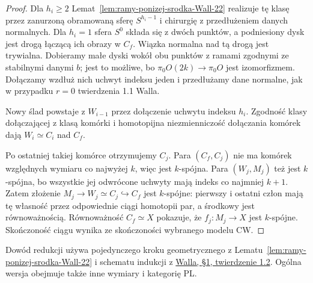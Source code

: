\begin{proof}
Dla $h_i\geq2$
Lemat~\ref{lem:ramy-ponizej-srodka-Wall-22}
realizuje tę klasę przez zanurzoną
obramowaną sferę $S^{h_i-1}$ i chirurgię
z przedłużeniem danych normalnych.
Dla $h_i=1$ sfera $S^0$ składa się
z dwóch punktów, a podniesiony dysk
jest drogą łączącą ich obrazy w $C_f$.
Wiązka normalna nad tą drogą jest
trywialna. Dobieramy małe dyski wokół
obu punktów z ramami zgodnymi ze stabilnymi
danymi $b$; jest to możliwe, bo
$\pi_0 O(2k)\to\pi_0 O$ jest izomorfizmem.
Dołączamy wzdłuż nich uchwyt indeksu jeden
i przedłużamy dane normalne, jak w przypadku
$r=0$ twierdzenia 1.1 Walla.

Nowy ślad powstaje z $W_{i-1}$ przez
dołączenie uchwytu indeksu $h_i$.
Zgodność klasy dołączającej z klasą
komórki i homotopijna niezmienniczość
dołączania komórek dają
$W_i\simeq C_i$ nad $C_f$.

Po ostatniej takiej komórce otrzymujemy
$C_j$. Para $(C_f,C_j)$ nie ma komórek
względnych wymiaru co najwyżej $k$,
więc jest $k$-spójna. Para $(W_j,M_j)$
też jest $k$-spójna, bo wszystkie jej
odwrócone uchwyty mają indeks co najmniej
$k+1$. Zatem złożenie
$M_j\to W_j\simeq C_j\hookrightarrow C_f$
jest $k$-spójne: pierwszy i ostatni człon
mają tę własność przez odpowiednie
ciągi homotopii par, a środkowy jest
równoważnością. Równoważność $C_f\simeq X$
pokazuje, że $f_j:M_j\to X$ jest
$k$-spójne.
Skończoność ciągu wynika ze skończoności
wybranego modelu CW.
\end{proof}

Dowód redukcji używa pojedynczego kroku
geometrycznego z Lematu~\ref{lem:ramy-ponizej-srodka-Wall-22}
i schematu indukcji z
\href{https://webhomes.maths.ed.ac.uk/~v1ranick/books/scm.pdf}
{Walla, §1, twierdzenie 1.2}. Ogólna wersja
obejmuje także inne wymiary i kategorię PL.

